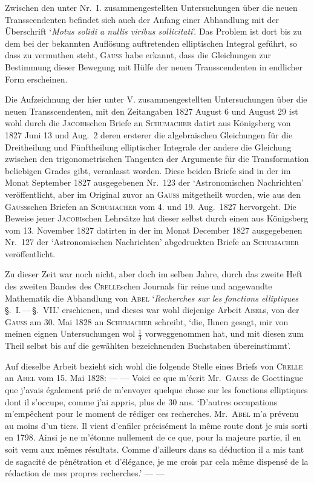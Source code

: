 \medskip
Zwischen den unter Nr.\ I. zusammengestellten Untersuchungen über die neuen Transscendenten befindet sich auch der Anfang einer Abhandlung mit der Überschrift ‘\textit{Motus solidi a nullis viribus sollicitati}’. Das Problem ist dort bis zu dem bei der bekannten Auflösung auftretenden elliptischen Integral geführt, so dass zu vermuthen steht, \textsc{Gauss} habe erkannt, dass die Gleichungen zur Bestimmung dieser Bewegung mit Hülfe der neuen Transscendenten in endlicher Form erscheinen.

Die Aufzeichnung der hier unter V. zusammengestellten Untersuchungen über die neuen Transscendenten, mit den Zeitangaben 1827 August 6 und August 29 ist wohl durch die \textsc{Jacobi}schen Briefe an \textsc{Schumacher} datirt aus Königsberg von 1827 Juni 13 und Aug.\ 2 deren ersterer die algebraischen Gleichungen für die Dreitheilung und Fünftheilung elliptischer Integrale der andere die Gleichung zwischen den trigonometrischen Tangenten der Argumente für die Transformation beliebigen Grades gibt, veranlasst worden. Diese beiden Briefe sind in der im Monat September 1827 ausgegebenen Nr.\ 123 der ‘Astronomischen Nachrichten’ veröffentlicht, aber im Original zuvor an \textsc{Gauss} mitgetheilt worden, wie aus den \textsc{Gauss}schen Briefen an \textsc{Schumacher} vom 4. und 19. Aug.\ 1827 hervorgeht. Die Beweise jener \textsc{Jacobi}schen Lehrsätze hat dieser selbst durch einen aus Königsberg vom 13. November 1827 datirten in der im Monat December 1827 ausgegebenen Nr.\ 127 der ‘Astronomischen Nachrichten’ abgedruckten Briefe an \textsc{Schumacher} veröffentlicht.

Zu dieser Zeit war noch nicht, aber doch im selben Jahre, durch das zweite Heft des zweiten Bandes des \textsc{Crelle}schen Journals für reine und angewandte Mathematik die Abhandlung von \textsc{Abel} ‘\textit{Recherches sur les fonctions elliptiques} \S.\ I.\,---\,\S.\ VII.’ erschienen, und dieses war wohl diejenige Arbeit \textsc{Abel}s, von der \textsc{Gauss} am 30. Mai 1828 an \textsc{Schumacher} schreibt, ‘die, Ihnen gesagt, mir von meinen eignen Untersuchungen wol \(\frac{1}{3}\) vorweggenommen hat, und mit diesen zum Theil selbst bis auf die gewählten bezeichnenden Buchstaben übereinstimmt’.

Auf dieselbe Arbeit bezieht sich wohl die folgende Stelle eines Briefs von \textsc{Crelle} an \textsc{Abel} vom 15. Mai 1828: --- --- Voici ce que m’écrit Mr.\ \textsc{Gauss} de Goettingue que j’avais également prié de m’envoyer quelque chose sur les fonctions elliptiques dont il s’occupe, comme j’ai appris, plus de 30 ans. ‘D’autres occupations m’empêchent pour le moment de rédiger ces recherches. Mr.\ \textsc{Abel} m’a prévenu au moins d’un tiers. Il vient d’enfiler précisément la même route dont je suis sorti en 1798. Ainsi je ne m’étonne nullement de ce que, pour la majeure partie, il en soit venu aux mêmes résultats. Comme d’ailleurs dans sa déduction il a mis tant de sagacité de pénétration et d’élégance, je me crois par cela même dispensé de la rédaction de mes propres recherches.’ --- ---

